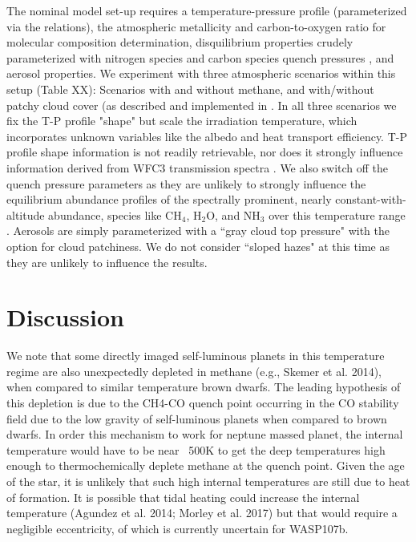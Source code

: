 \documentclass[twocolumn]{aastex61}
\begin{document}
The nominal model set-up requires a temperature-pressure profile (parameterized via the \citealt{guillot10} relations), the atmospheric metallicity and carbon-to-oxygen ratio for molecular composition determination, disquilibrium properties crudely parameterized with nitrogen species and carbon species quench pressures \citep{morley17}, and aerosol properties.  We experiment with three atmospheric scenarios within this setup (Table XX):  Scenarios with and without methane, and with/without patchy cloud cover (as described and implemented in \citealt{line16}.  In all three scenarios we fix the T-P profile "shape" but scale the irradiation temperature, which incorporates unknown variables like the albedo and heat transport efficiency.  T-P profile shape information is not readily retrievable, nor does it strongly influence information derived from WFC3 transmission spectra \citep[e.g.][]{kreidberg15b}. We also switch off the quench pressure parameters as they are unlikely to strongly influence the equilibrium abundance profiles of the spectrally prominent, nearly constant-with-altitude abundance, species like CH$_4$, H$_2$O, and NH$_3$ over this temperature range \citep[e.g.][]{line11, moses13}.  Aerosols are simply parameterized with a ``gray cloud top pressure" with the option for cloud patchiness. We do not consider ``sloped hazes" at this time as they are unlikely to influence the results.

\section{Discussion} \label{sec:discuss}


We note that some directly imaged self-luminous planets in this temperature regime are also unexpectedly depleted in methane (e.g., Skemer et al. 2014), when compared to similar temperature brown dwarfs.   The leading hypothesis of this depletion \citep{zahnle15} is due to the CH4-CO quench point occurring in the CO stability field due to the low gravity of self-luminous planets when compared to brown dwarfs.  In order this mechanism to work for neptune massed planet, the internal temperature would have to be near ~500K to get the deep temperatures high enough to thermochemically deplete methane at the quench point. Given the age of the star, it is unlikely that such high internal temperatures are still due to heat of formation. It is possible that tidal heating could increase the internal temperature (Agundez et al. 2014; Morley et al. 2017) but that would require a negligible eccentricity, of which is currently uncertain for WASP107b.
\end{document}
